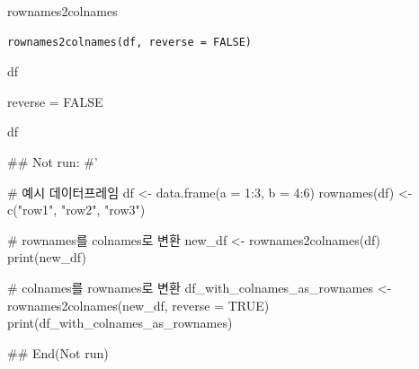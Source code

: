\documentclass[a4paper]{book}
\begin{document}
%
\begin{Description}
rownames2colnames
\end{Description}
%
\begin{Usage}
\begin{verbatim}
rownames2colnames(df, reverse = FALSE)
\end{verbatim}
\end{Usage}
%
\begin{Arguments}
\begin{ldescription}
\item[\code{df}] df

\item[\code{reverse}] reverse = FALSE
\end{ldescription}
\end{Arguments}
%
\begin{Value}
df
\end{Value}
%
\begin{Examples}
\begin{ExampleCode}
\#\# Not run: 
#'

# 예시 데이터프레임
df <- data.frame(a = 1:3, b = 4:6)
rownames(df) <- c("row1", "row2", "row3")

# rownames를 colnames로 변환
new_df <- rownames2colnames(df)
print(new_df)

# colnames를 rownames로 변환
df_with_colnames_as_rownames <- rownames2colnames(new_df, reverse = TRUE)
print(df_with_colnames_as_rownames)

## End(Not run)
\end{ExampleCode}
\end{Examples}
\end{document}
